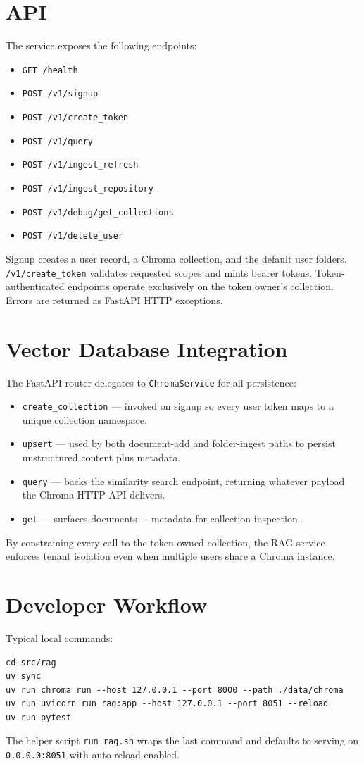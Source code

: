 \documentclass[11pt]{article}
\begin{document}
\section{API}
The service exposes the following endpoints:
\begin{itemize}[leftmargin=*]
  \item \texttt{GET /health}
  \item \texttt{POST /v1/signup}
  \item \texttt{POST /v1/create\_token}
  \item \texttt{POST /v1/query}
  \item \texttt{POST /v1/ingest\_refresh}
  \item \texttt{POST /v1/ingest\_repository}
  \item \texttt{POST /v1/debug/get\_collections}
  \item \texttt{POST /v1/delete\_user}
\end{itemize}
Signup creates a user record, a Chroma collection, and the default user folders. \texttt{/v1/create\_token} validates requested scopes and mints bearer tokens. Token-authenticated endpoints operate exclusively on the token owner's collection. Errors are returned as FastAPI HTTP exceptions.

\section{Vector Database Integration}
The FastAPI router delegates to \texttt{ChromaService} for all persistence:
\begin{itemize}[leftmargin=*]
  \item \texttt{create\_collection} --- invoked on signup so every user token maps to a unique collection namespace.
  \item \texttt{upsert} --- used by both document-add and folder-ingest paths to persist unstructured content plus metadata.
  \item \texttt{query} --- backs the similarity search endpoint, returning whatever payload the Chroma HTTP API delivers.
  \item \texttt{get} --- surfaces documents + metadata for collection inspection.
\end{itemize}
By constraining every call to the token-owned collection, the RAG service enforces tenant isolation even when multiple users share a Chroma instance.

\section{Developer Workflow}
Typical local commands:
\begin{verbatim}
cd src/rag
uv sync
uv run chroma run --host 127.0.0.1 --port 8000 --path ./data/chroma
uv run uvicorn run_rag:app --host 127.0.0.1 --port 8051 --reload
uv run pytest
\end{verbatim}
The helper script \texttt{run\_rag.sh} wraps the last command and defaults to serving on \texttt{0.0.0.0:8051} with auto-reload enabled.
\end{document}
